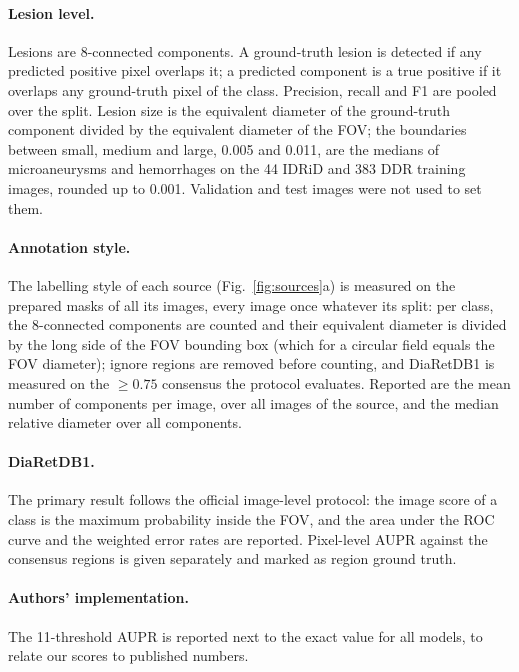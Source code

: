 \paragraph{Lesion level.} Lesions are 8-connected components. A ground-truth lesion is detected if any predicted positive pixel overlaps it; a predicted component is a true positive if it overlaps any ground-truth pixel of the class. Precision, recall and F1 are pooled over the split. Lesion size is the equivalent diameter of the ground-truth component divided by the equivalent diameter of the FOV; the boundaries between small, medium and large, 0.005 and 0.011, are the medians of microaneurysms and hemorrhages on the 44 IDRiD and 383 DDR training images, rounded up to 0.001. Validation and test images were not used to set them.

\paragraph{Annotation style.} The labelling style of each source (Fig.~\ref{fig:sources}a) is measured on the prepared masks of all its images, every image once whatever its split: per class, the 8-connected components are counted and their equivalent diameter is divided by the long side of the FOV bounding box (which for a circular field equals the FOV diameter); ignore regions are removed before counting, and DiaRetDB1 is measured on the $\geq0.75$ consensus the protocol evaluates. Reported are the mean number of components per image, over all images of the source, and the median relative diameter over all components.

\paragraph{DiaRetDB1.} The primary result follows the official image-level protocol: the image score of a class is the maximum probability inside the FOV, and the area under the ROC curve and the weighted error rates are reported. Pixel-level AUPR against the consensus regions is given separately and marked as region ground truth.

\paragraph{Authors' implementation.} The 11-threshold AUPR is reported next to the exact value for all models, to relate our scores to published numbers.

